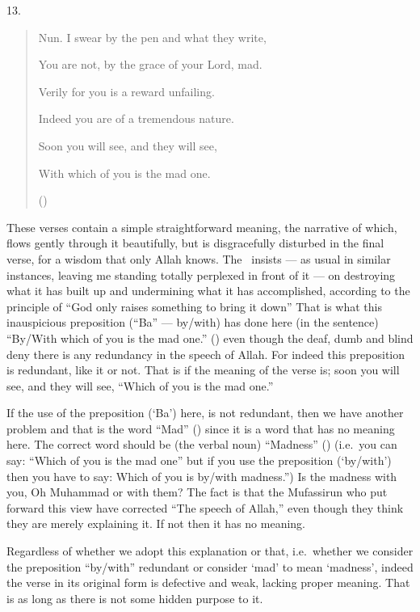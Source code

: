\documentclass[12pt]{memoir}
\begin{document}
13.

\begin{quote}
Nun. I swear by the pen and what they write,

You are not, by the grace of your Lord, mad.

Verily for you is a reward unfailing.

Indeed you are of a tremendous nature.

Soon you will see, and they will see,

With which of you is the mad one.

()
\end{quote}

These verses contain a simple straightforward meaning,
the narrative of which, flows gently through it beautifully,
but is disgracefully disturbed in the final verse,
for a wisdom that only Allah knows.
The \Quran\ insists — as usual in similar instances,
leaving me standing totally perplexed in front of it —
on destroying what it has built up and undermining what it has accomplished,
according to the principle of
“God only raises something to bring it down”\fnmarksym[*]{}
That is what this inauspicious preposition  (“Ba” — by/with)
has done here (in the sentence) “By/With which of you is the mad one.”
() even though the deaf, dumb and blind deny
there is any redundancy in the speech of Allah.
For indeed this preposition is redundant, like it or not.
That is if the meaning of the verse is; soon you will see,
and they will see, “Which of you is the mad one.”

If the use of the preposition  (‘Ba’) here, is not redundant,
then we have another problem and that is the word “Mad” ()
since it is a word that has no meaning here.
The correct word should be (the verbal noun) “Madness” ()
(i.e.\ you can say: “Which of you is the mad one”
but if you use the preposition  (‘by/with’)
then you have to say: Which of you is by/with madness.”)
Is the madness with you, Oh Muhammad or with them?
The fact is that the Mufassirun who put forward this view have corrected
“The speech of Allah,” even though they think they are merely explaining it.
If not then it has no meaning.

Regardless of whether we adopt this explanation or that,
i.e.\ whether we consider the preposition “by/with” redundant
or consider ‘mad’ to mean ‘madness’, indeed the verse in its original form
is defective and weak, lacking proper meaning.
That is as long as there is not some hidden purpose to it.
\end{document}
